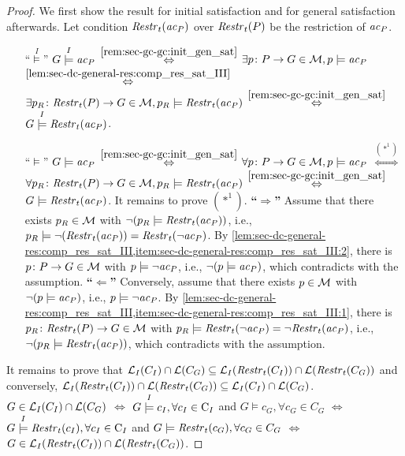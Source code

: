 \begin{proof}
We first show the result for initial satisfaction and for general satisfaction afterwards.
Let condition $\mathit{Restr}_t(\mathit{ac}_P)$ over $\mathit{Restr}_t(P)$ be the restriction of $\mathit{ac}_P$.
\begin{enumerate}
  \item [``$\stackrel{I}{\models}$''] $G \stackrel{I}{\models} \mathit{ac}_P$ $\stackrel{\cref{rem:sec-gc-gc:init_gen_sat}}{\Leftrightarrow}$ $\exists p\colon P \to G \in {\cal M},p \models \mathit{ac}_P$ $\stackrel{\cref{lem:sec-dc-general-res:comp_res_sat_III}}{\Leftrightarrow}$ $\exists p_R\colon \mathit{Restr}_t(P) \to G \in {\cal M},p_R \models \mathit{Restr}_t(\mathit{ac}_P)$ $\stackrel{\cref{rem:sec-gc-gc:init_gen_sat}}{\Leftrightarrow}$ $G \stackrel{I}{\models} \mathit{Restr}_t(\mathit{ac}_P)$.
  \item [``$\models$''] $G \models \mathit{ac}_P$ $\stackrel{\cref{rem:sec-gc-gc:init_gen_sat}}{\Leftrightarrow}$ $\forall p\colon P \to G \in {\cal M},p \models \mathit{ac}_P$ $\stackrel{(*^1)}{\Leftrightarrow}$ $\forall p_R\colon \mathit{Restr}_t(P) \to G \in {\cal M},p_R \models \mathit{Restr}_t(\mathit{ac}_P)$ $\stackrel{\cref{rem:sec-gc-gc:init_gen_sat}}{\Leftrightarrow}$ $G \models \mathit{Restr}_t(\mathit{ac}_P)$.
  It remains to prove $(*^1)$.
  \textbf{``$\Rightarrow$''} Assume that there exists $p_R \in {\cal M}$ with $\neg(p_R \models \mathit{Restr}_t(\mathit{ac}_P))$, i.e., $p_R \models \neg(\mathit{Restr}_t(\mathit{ac}_P))=\mathit{Restr}_t(\neg\mathit{ac}_P)$.
  By \cref{lem:sec-dc-general-res:comp_res_sat_III,item:sec-dc-general-res:comp_res_sat_III:2}, there is $p\colon P \to G \in {\cal M}$ with $p \models \neg\mathit{ac}_P$, i.e., $\neg(p \models \mathit{ac}_P)$, which contradicts with the assumption.
  \textbf{``$\Leftarrow$''} Conversely, assume that there exists $p \in {\cal M}$ with $\neg(p \models \mathit{ac}_P)$, i.e., $p \models \neg\mathit{ac}_P$.
  By \cref{lem:sec-dc-general-res:comp_res_sat_III,item:sec-dc-general-res:comp_res_sat_III:1}, there is $p_R\colon \mathit{Restr}_t(P) \to G \in {\cal M}$ with $p_R \models \mathit{Restr}_t(\neg\mathit{ac}_P)=\neg\mathit{Restr}_t(\mathit{ac}_P)$, i.e., $\neg(p_R \models \mathit{Restr}_t(\mathit{ac}_P))$, which contradicts with the assumption.
\end{enumerate}
It remains to prove that $\mathcal{L}_I(C_I) \cap \mathcal{L}(C_G) \subseteq \mathcal{L}_I(\mathit{Restr}_t(C_I)) \cap \mathcal{L}(\mathit{Restr}_t(C_G))$ and conversely, $\mathcal{L}_I(\mathit{Restr}_t(C_I)) \cap \mathcal{L}(\mathit{Restr}_t(C_G)) \subseteq \mathcal{L}_I(C_I) \cap \mathcal{L}(C_G)$.
$G \in \mathcal{L}_I(C_I) \cap \mathcal{L}(C_G)$ $\Leftrightarrow$ $G \stackrel{I}{\models} c_I,\forall c_I \in \mathrm{C}_I$ and $G \models c_G,\forall c_G \in C_G$ $\Leftrightarrow$ $G \stackrel{I}{\models} \mathit{Restr}_t(c_I),\forall c_I \in \mathrm{C}_I$ and $G \models \mathit{Restr}_t(c_G),\forall c_G \in C_G$ $\Leftrightarrow$ $G \in \mathcal{L}_I(\mathit{Restr}_t(C_I)) \cap \mathcal{L}(\mathit{Restr}_t(C_G))$.
\end{proof}

